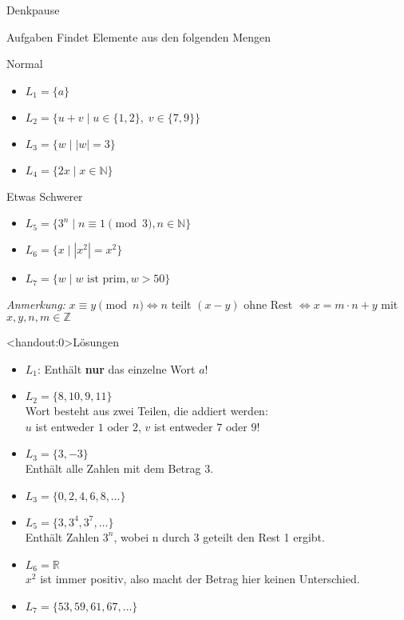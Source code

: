 {
\begin{frame}[fragile]{Denkpause}
    \footnotesize
        \begin{alertblock}{Aufgaben}
            Findet Elemente aus den folgenden Mengen
        \end{alertblock}
        \begin{block}{Normal}
            \begin{itemize}
                \item $L_1 = \{a\}$
                \item $L_2 = \{u+v \mid u\in\{1,2\},\;v\in\{7,9\}\}$
                \item $L_3 = \{w \mid |w| = 3\}$
                \item $L_4 = \{2x \mid x\in \mathbb N\}$
            \end{itemize}
        \end{block}
        \begin{block}{Etwas Schwerer}
            \begin{itemize}
                \item $L_5 = \{3^n \mid n \equiv 1 \pmod 3, n\in\mathbb{N}\}$
                \item $L_6 = \{x \mid |x^2| = x^2\}$
                \item $L_7 = \{w \mid w \text{ ist prim}, w > 50\}$
            \end{itemize}
        \end{block}
        \emph{Anmerkung:} $x \equiv y \pmod n \iff n$ teilt $(x-y)$ ohne Rest $\iff x = m \cdot n + y$ mit $x,y,n,m \in \mathbb{Z}$
\end{frame}
}

{
\begin{frame}<handout:0>{Lösungen}
  \begin{itemize}[<+- | alert@+>]
        \item 
            $L_1$: Enthält \textbf{nur} das einzelne Wort $a$!
        \item
            $L_2 = \{8, 10, 9, 11\}$\\
            Wort besteht aus zwei Teilen, die addiert werden:\\ $u$ ist entweder $1$ oder $2$, $v$ ist entweder $7$ oder $9$!
        \item
            $L_3 = \{3, -3\}$\\
            Enthält alle Zahlen mit dem Betrag $3$.
        \item $L_3 = \{0, 2, 4, 6, 8, \dots \}$
        \item 
        $L_5 = \{3, 3^4, 3^7, \dots\}$\\
            Enthält Zahlen $3^n$, wobei n durch 3 geteilt den Rest 1 ergibt.
        \item
            $L_6 = \mathbb{R}$\\
            $x^2$ ist immer positiv, also macht der Betrag hier keinen Unterschied.
        \item
            $L_7 = \{53, 59, 61, 67, \dots\}$
    \end{itemize}
\end{frame}
}
